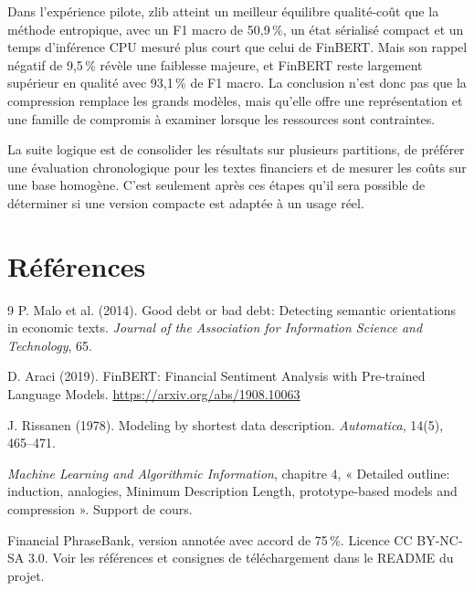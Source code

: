 \documentclass[11pt,a4paper]{article}
\begin{document}
Dans l'expérience pilote, zlib atteint un meilleur équilibre qualité-coût
que la méthode entropique, avec un F1 macro de 50,9\,\%, un état sérialisé
compact et un temps d'inférence CPU mesuré plus court que celui de FinBERT.
Mais son rappel négatif de 9,5\,\% révèle une faiblesse majeure, et FinBERT
reste largement supérieur en qualité avec 93,1\,\% de F1 macro. La conclusion
n'est donc pas que la compression remplace les grands modèles, mais qu'elle
offre une représentation et une famille de compromis à examiner lorsque les
ressources sont contraintes.

La suite logique est de consolider les résultats sur plusieurs partitions,
de préférer une évaluation chronologique pour les textes financiers et de
mesurer les coûts sur une base homogène. C'est seulement après ces étapes
qu'il sera possible de déterminer si une version compacte est adaptée à un
usage réel.

\section*{Références}
\begin{thebibliography}{9}
P. Malo et al. (2014).
\newblock Good debt or bad debt: Detecting semantic orientations in economic
texts.
\newblock \emph{Journal of the Association for Information Science and
Technology}, 65.

D. Araci (2019).
\newblock FinBERT: Financial Sentiment Analysis with Pre-trained Language
Models.
\newblock \url{https://arxiv.org/abs/1908.10063}

J. Rissanen (1978).
\newblock Modeling by shortest data description.
\newblock \emph{Automatica}, 14(5), 465--471.

\emph{Machine Learning and Algorithmic Information}, chapitre 4,
« Detailed outline: induction, analogies, Minimum Description Length,
prototype-based models and compression ». Support de cours.

Financial PhraseBank, version annotée avec accord de 75\,\%.
\newblock Licence CC BY-NC-SA 3.0. Voir les références et consignes de
téléchargement dans le README du projet.
\end{thebibliography}
\end{document}
